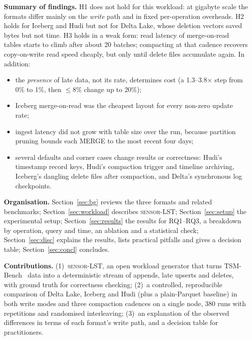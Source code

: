\documentclass[conference]{IEEEtran}
\newcommand{\sys}{\textsc{sensor-LST}}
\begin{document}
\textbf{Summary of findings.} H1 does not hold for this workload: at gigabyte scale the formats differ mainly on the
\emph{write} path and in fixed per-operation overheads. H2 holds for Iceberg and Hudi but not for Delta Lake, whose
deletion vectors saved bytes but not time. H3 holds in a weak form: read latency of merge-on-read tables starts to climb
after about 20 batches; compacting at that cadence recovers copy-on-write read speed cheaply, but only until delete files accumulate again. In addition:
\begin{itemize}
\item the \emph{presence} of late data, not its rate, determines cost (a 1.3--3.8$\times$ step from 0\% to 1\%, then
$\le$8\% change up to 20\%);
\item Iceberg merge-on-read was the cheapest layout for every non-zero update rate;
\item ingest latency did not grow with table size over the run, because partition pruning bounds each MERGE to the
most recent four days;
\item several defaults and corner cases change results or correctness: Hudi's timestamp record keys, Hudi's compaction
trigger and timeline archiving, Iceberg's dangling delete files after compaction, and Delta's synchronous log
checkpoints.
\end{itemize}

\textbf{Organisation.} Section~\ref{sec:bg} reviews the three formats and related benchmarks;
Section~\ref{sec:workload} describes \sys{}; Section~\ref{sec:setup} the experimental setup;
Section~\ref{sec:results} the results for RQ1--RQ3, a breakdown by operation, query and time, an ablation and a statistical check;
Section~\ref{sec:disc} explains the results, lists practical pitfalls and gives a decision table;
Section~\ref{sec:concl} concludes.

\textbf{Contributions.} (1)~\sys{}, an open workload generator that turns TSM-Bench~\cite{khelifati2023tsmbench}
data into a deterministic stream of appends, late upserts and deletes, with ground truth for correctness checking;
(2)~a controlled, reproducible comparison of Delta Lake, Iceberg and Hudi (plus a plain-Parquet baseline) in both
write modes and three compaction cadences on a single node, 380 runs with repetitions and randomised
interleaving; (3)~an explanation of the observed differences in terms of each format's write path, and a decision
table for practitioners.

\end{document}
